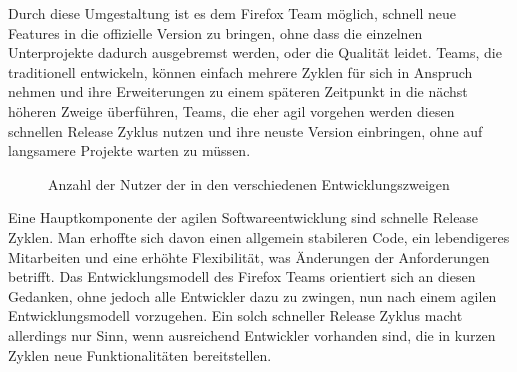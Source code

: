Durch diese Umgestaltung ist es dem Firefox Team möglich, schnell neue Features in die offizielle Version zu bringen, ohne dass die einzelnen Unterprojekte dadurch ausgebremst werden, oder die Qualität leidet. Teams, die traditionell entwickeln, können einfach mehrere Zyklen für sich in Anspruch nehmen und ihre Erweiterungen zu einem späteren Zeitpunkt in die nächst höheren Zweige überführen, Teams, die eher agil vorgehen werden diesen schnellen Release Zyklus nutzen und ihre neuste Version einbringen, ohne auf langsamere Projekte warten zu müssen.

\begin{figure}[h]
	\centering
	\caption{Anzahl der Nutzer der in den verschiedenen Entwicklungszweigen \cite{bib:fire-development}}
	\label{fireusers}
\end{figure}

Eine Hauptkomponente der agilen Softwareentwicklung sind schnelle Release Zyklen. Man erhoffte sich davon einen allgemein stabileren Code, ein lebendigeres Mitarbeiten und eine erhöhte Flexibilität, was Änderungen der Anforderungen betrifft. Das Entwicklungsmodell des Firefox Teams orientiert sich an diesen Gedanken, ohne jedoch alle Entwickler dazu zu zwingen, nun nach einem agilen Entwicklungsmodell vorzugehen. Ein solch schneller Release Zyklus macht allerdings nur Sinn, wenn ausreichend Entwickler vorhanden sind, die in kurzen Zyklen neue Funktionalitäten bereitstellen.

